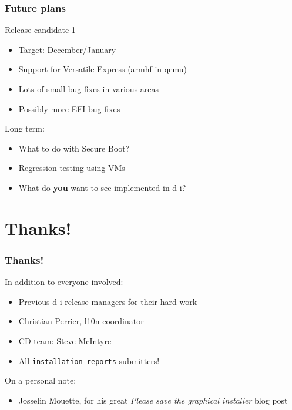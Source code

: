 \documentclass[handout]{beamer}
\begin{document}
\begin{frame}[fragile]
  \frametitle{Future plans}

  Release candidate 1
  \begin{itemize}
  \item Target: December/January
  \item Support for Versatile Express (armhf in qemu)
  \item Lots of small bug fixes in various areas
  \item Possibly more EFI bug fixes
  \end{itemize}

  \vspace{1em}
  \pause

  Long term:
  \begin{itemize}
  \item What to do with Secure Boot?
  \item Regression testing using VMs
  \item What do \textbf{you} want to see implemented in d-i?
  \end{itemize}
\end{frame}


\section*{Thanks!}
\begin{frame}[fragile]
  \frametitle{Thanks!}

  In addition to everyone involved:
  \begin{itemize}
  \item Previous d-i release managers for their hard work
  \item Christian Perrier, l10n coordinator
  \item CD team: Steve McIntyre
  \item All \texttt{installation-reports} submitters!
  \end{itemize}

  \vspace{1em}
  \pause
  On a personal note:
  \begin{itemize}
  \item Josselin Mouette, for his great \textit{Please save the graphical installer} blog post
  \end{itemize}
\end{frame}

\section*{}
\end{document}
